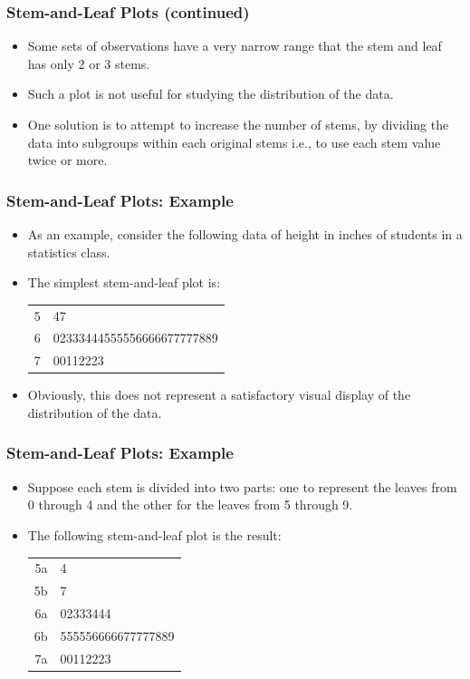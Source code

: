 \documentclass[xcolor=dvipsnames,12pt]{beamer}
\begin{document}
\begin{frame}
\frametitle{Stem-and-Leaf Plots (continued)}
\begin{itemize}
\item Some sets of observations have a very narrow range that the stem and
leaf has only 2 or 3 stems.  
\item Such a plot is not useful for studying the
distribution of the data.  
\item One solution is to attempt to increase the 
number of stems, by dividing the data into subgroups within each 
original stems i.e., to use each stem value twice or more.  
\end{itemize}
\end{frame}

\begin{frame}
\frametitle{Stem-and-Leaf Plots: Example}
\begin{itemize}
\item As an example, consider the following data of height in inches
of students in a statistics class.
\item  The simplest stem-and-leaf plot is:
\begin{center}
\begin{tabular}{l|l}
                    5 & 47\\
                    6 & 02333444555556666677777889\\
                    7 & 00112223
\end{tabular}
\end{center}
\item  Obviously, this does not represent a satisfactory visual 
display of the distribution of the data.  
\end{itemize}
\end{frame}



\begin{frame}
\frametitle{Stem-and-Leaf Plots: Example}
\begin{itemize}
\item Suppose each stem is divided into two parts:
one to represent the leaves from 0 through 4 and the other for the 
leaves from 5 through 9.  
\item  The following stem-and-leaf plot is the result:
\begin{center}
\begin{tabular}{r|l}
                    5a & 4\\
                    5b & 7\\
                    6a & 02333444\\
                    6b & 555556666677777889\\
                    7a & 00112223
\end{tabular}
\end{center}
\end{itemize}
\end{frame}
\end{document}
